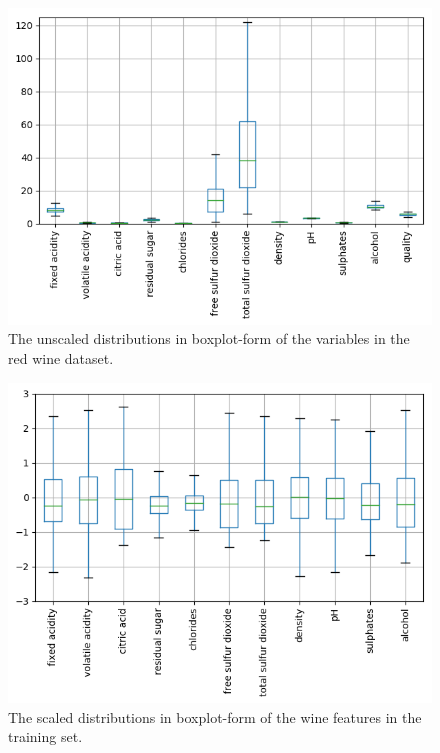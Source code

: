 \documentclass[12pt,preprint]{aastex61}
\begin{document}
 \begin{figure}
 \centering 
 \includegraphics[angle=0,width=130mm]{../output/allDataBoxPlot.png}
 \caption{
   The unscaled distributions in boxplot-form of the variables in the red wine dataset. 
 \label{FIG-Data-Box}}
 \end{figure}


 \begin{figure}
 \centering 
 \includegraphics[angle=0,width=130mm]{../output/scaledTrainDataBoxPlot.png}
 \caption{
   The scaled distributions in boxplot-form of the wine features in the training set.
 \label{FIG-Scaled-Data-Box}}
 \end{figure}
\end{document}
